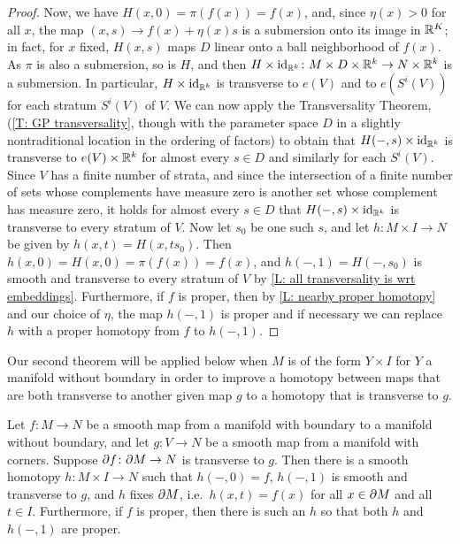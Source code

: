 \begin{proof}
	Now, we have $H(x,0) = \pi(f(x)) = f(x)$, and, since $\eta(x)>0$ for all $x$, the map $(x,s) \to f(x)+ \eta(x)s$ is a submersion onto its image in $\mathbb{R}^K$; in fact, for $x$ fixed, $H(x,s)$ maps $D$ linear onto a ball neighborhood of $f(x)$.
	As $\pi$ is also a submersion, so is $H$, and then $H \times \mathrm{id}_{\mathbb{R}^k} \colon M \times D \times \mathbb{R}^k \to N \times \mathbb{R}^k$ is a submersion.
	In particular, $H \times \mathrm{id}_{\mathbb{R}^k}$ is transverse to $e(V)$ and to $e(S^i(V))$ for each stratum $S^i(V)$ of $V$.
	We can now apply the Transversality Theorem, (\cref{T: GP transversality}, though with the parameter space $D$ in a slightly nontraditional location in the ordering of factors) to obtain that $H(-,s) \times \mathrm{id}_{\mathbb{R}^k}$ is transverse to $e(V) \times \mathbb{R}^k$ for almost every $s \in D$ and similarly for each $S^i(V)$.
	Since $V$ has a finite number of strata, and since the intersection of a finite number of sets whose complements have measure zero is another set whose complement has measure zero, it holds for almost every $s \in D$ that $H(-,s) \times \mathrm{id}_{\mathbb{R}^k}$ is transverse to every stratum of $V$.
	Now let $s_0$ be one such $s$, and let $h \colon M \times I \to N$ be given by $h(x,t) = H(x,ts_0)$.
	Then $h(x,0) = H(x,0) = \pi(f(x)) = f(x)$, and $h(-,1) = H(-,s_0)$ is smooth and transverse to every stratum of $V$ by \cref{L: all transversality is wrt embeddings}.
	Furthermore, if $f$ is proper, then by \cref{L: nearby proper homotopy} and our choice of $\eta$, the map $h(-,1)$ is proper and if necessary we can replace $h$ with a proper homotopy from $f$ to $h(-,1)$. \qedhere
	
	\begin{comment}
	If $f|_{\bd M}$ is already transverse to $g$, we modify the construction as follows: Let $\rho \colon M \to [0,1]$ be a smooth function that is $0$ on $\bd M$ and $>0$ on $M-\bd M$.
	Then we define
	$$H(x,s) = \pi(f(x)+ \epsilon(f(x))\rho(x)s).$$
	Then when $x \in \bd M$, we have $H(x,s) = \pi(f(x)) = f(x)$, so $h$ is constant along $\bd M$.
	For $x \notin \bd M$, the argument goes through exactly as above.
	\end{comment}
\end{proof}

Our second theorem will be applied below when $M$ is of the form $Y \times I$ for $Y$ a manifold without boundary in order to improve a homotopy between maps that are both transverse to another given map $g$ to a homotopy that is transverse to $g$. 

\begin{theorem}\label{T: homotopy trans}
	Let $f \colon M \to N$ be a smooth map from a manifold with boundary to a manifold without boundary, and let $g \colon V \to N$ be a smooth map from a manifold with corners.
	Suppose $\partial f \colon \partial M \to N$ is transverse to $g$.
	Then there is a smooth homotopy $h \colon M \times I \to N$ such that $h(-,0) = f$, $h(-,1)$ is smooth and transverse to $g$, and $h$ fixes $\partial M$, i.e.\ $h(x,t)=f(x)$ for all $x \in \partial M$ and all $t \in I$.
	Furthermore, if $f$ is proper, then there is such an $h$ so that both $h$ and $h(-,1)$ are proper. 
\end{theorem}

